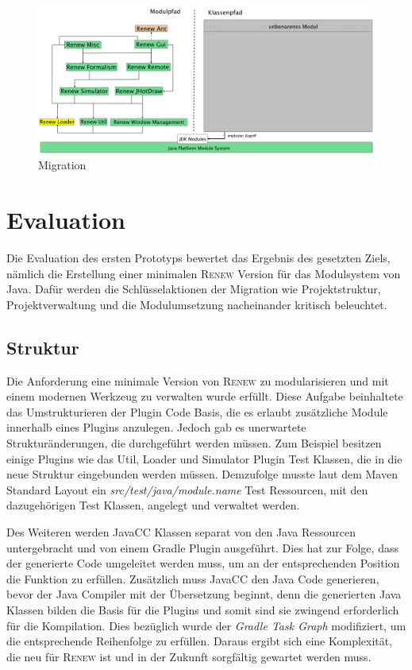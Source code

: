   	 \begin{figure}[h!] 
	  \centering
  	  \includegraphics[width=0.997\textwidth]{material/images/renew_plugin_dependencies-migrate_4b.pdf}
  	  \caption{Migration}
	  \label{fig:mig}
	\end{figure}

\newpage
\section{Evaluation}
	Die Evaluation des ersten Prototyps bewertet das Ergebnis des gesetzten Ziels, nämlich die Erstellung einer minimalen \textsc{Renew} Version für das Modulsystem von Java. Dafür werden die Schlüsselaktionen der Migration wie Projektstruktur, Projektverwaltung und die Modulumsetzung nacheinander kritisch beleuchtet.

\subsection{Struktur} \label{sub:struktur}
	Die Anforderung eine minimale Version von \textsc{Renew} zu modularisieren und mit einem modernen Werkzeug zu verwalten wurde erfüllt. Diese Aufgabe beinhaltete das Umstrukturieren der Plugin Code Basis, die es erlaubt zusätzliche Module innerhalb eines Plugins anzulegen. Jedoch gab es unerwartete Strukturänderungen, die durchgeführt werden müssen. Zum Beispiel besitzen einige Plugins wie das Util, Loader und Simulator Plugin Test Klassen, die in die neue Struktur eingebunden werden müssen. Demzufolge musste laut dem Maven Standard Layout ein \textit{src/test/java/module.name} Test Ressourcen, mit den dazugehörigen Test Klassen, angelegt und verwaltet werden. \newline

	Des Weiteren werden JavaCC Klassen separat von den Java Ressourcen untergebracht und von einem Gradle Plugin ausgeführt. Dies hat zur Folge, dass der generierte Code umgeleitet werden muss, um an der entsprechenden Position die Funktion zu erfüllen. Zusätzlich muss JavaCC den Java Code generieren, bevor der Java Compiler mit der Übersetzung beginnt, denn die generierten Java Klassen bilden die Basis für die Plugins und somit sind sie zwingend erforderlich für die Kompilation. Dies bezüglich wurde der \textit{Gradle Task Graph} modifiziert, um die entsprechende Reihenfolge zu erfüllen. Daraus ergibt sich eine Komplexität, die neu für \textsc{Renew} ist und in der Zukunft sorgfältig gewartet werden muss. \bigbreak

